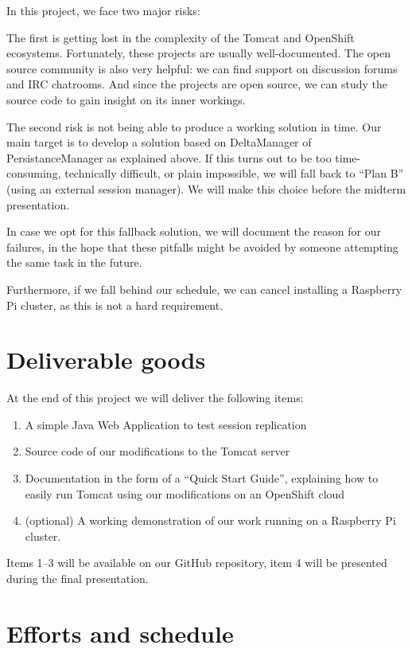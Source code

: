 \documentclass[11pt,a4paper]{article}
\begin{document}
In this project, we face two major risks:

The first is getting lost in the complexity of the Tomcat and OpenShift
ecosystems. Fortunately, these projects are usually well-documented. The open
source community is also very helpful: we can find support on discussion forums
and IRC chatrooms. And since the projects are open source, we can study the
source code to gain insight on its inner workings.

The second risk is not being able to produce a working solution in time. Our
main target is to develop a solution based on DeltaManager of
PersistanceManager as explained above. If this turns out to be too
time-consuming, technically difficult, or plain impossible, we will fall back
to ``Plan B'' (using an external session manager). We will make this choice
before the midterm presentation.

In case we opt for this fallback solution, we
will document the reason for our failures, in the hope that these pitfalls
might be avoided by someone attempting the same task in the future.

Furthermore, if we fall behind our schedule, we can cancel installing a
Raspberry Pi cluster, as this is not a hard requirement.

\section{Deliverable goods}

At the end of this project we will deliver the following items:

\begin{enumerate}
    \item A simple Java Web Application to test session replication
    \item Source code of our modifications to the Tomcat server
    \item Documentation in the form of a ``Quick Start Guide'', explaining how
        to easily run Tomcat using our modifications on an OpenShift cloud
    \item (optional) A working demonstration of our work running on a Raspberry
        Pi cluster.
\end{enumerate}

Items 1--3 will be available on our GitHub repository, item 4 will be presented
during the final presentation.

\section{Efforts and schedule}
\end{document}
